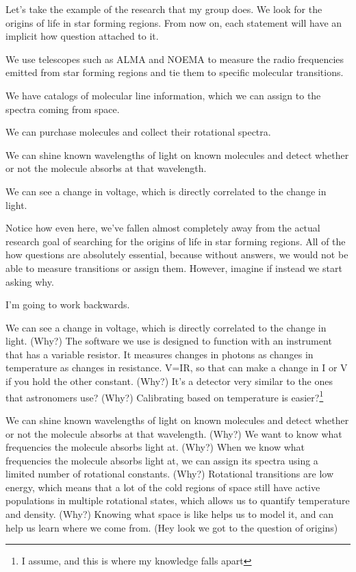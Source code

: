 \documentclass[12pt]{article}[titlepage]
\renewcommand{\,}{\textsuperscript{,}}
\begin{document}
Let's take the example of the research that my group does.
We look for the origins of life in star forming regions.
From now on, each statement will have an implicit how question attached to it.

We use telescopes such as ALMA and NOEMA to measure the radio frequencies emitted from star forming regions and tie them to specific molecular transitions.

We have catalogs of molecular line information, which we can assign to the spectra coming from space.

We can purchase molecules and collect their rotational spectra.

We can shine known wavelengths of light on known molecules and detect whether or not the molecule absorbs at that wavelength.

We can see a change in voltage, which is directly correlated to the change in light.

Notice how even here, we've fallen almost completely away from the actual research goal of searching for the origins of life in star forming regions.
All of the how questions are absolutely essential, because without answers, we would not be able to measure transitions or assign them.
However, imagine if instead we start asking why.

I'm going to work backwards.

We can see a change in voltage, which is directly correlated to the change in light. (Why?)
The software we use is designed to function with an instrument that has a variable resistor. It measures changes in photons as changes in temperature as changes in resistance. V=IR, so that can make a change in I or V if you hold the other constant. (Why?)
It's a detector very similar to the ones that astronomers use? (Why?)
Calibrating based on temperature is easier?\footnote{I assume, and this is where my knowledge falls apart}

We can shine known wavelengths of light on known molecules and detect whether or not the molecule absorbs at that wavelength. (Why?)
We want to know what frequencies the molecule absorbs light at. (Why?)
When we know what frequencies the molecule absorbs light at, we can assign its spectra using a limited number of rotational constants. (Why?)
Rotational transitions are low energy, which means that a lot of the cold regions of space still have active populations in multiple rotational states, which allows us to quantify temperature and density. (Why?)
Knowing what space is like helps us to model it, and can help us learn where we come from. (Hey look we got to the question of origins)
\end{document}
